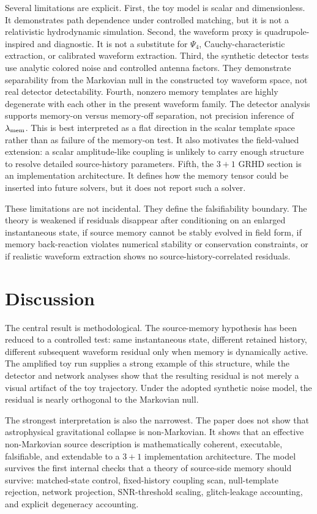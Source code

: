 \documentclass[11pt]{article}
\begin{document}
Several limitations are explicit. First, the toy model is scalar and dimensionless. It demonstrates path dependence under controlled matching, but it is not a relativistic hydrodynamic simulation. Second, the waveform proxy is quadrupole-inspired and diagnostic. It is not a substitute for \(\Psi_4\), Cauchy-characteristic extraction, or calibrated waveform extraction. Third, the synthetic detector tests use analytic colored noise and controlled antenna factors. They demonstrate separability from the Markovian null in the constructed toy waveform space, not real detector detectability. Fourth, nonzero memory templates are highly degenerate with each other in the present waveform family. The detector analysis supports memory-on versus memory-off separation, not precision inference of \(\lambda_{\rm mem}\). This is best interpreted as a flat direction in the scalar template space rather than as failure of the memory-on test. It also motivates the field-valued extension: a scalar amplitude-like coupling is unlikely to carry enough structure to resolve detailed source-history parameters. Fifth, the \(3+1\) GRHD section is an implementation architecture. It defines how the memory tensor could be inserted into future solvers, but it does not report such a solver.

These limitations are not incidental. They define the falsifiability boundary. The theory is weakened if residuals disappear after conditioning on an enlarged instantaneous state, if source memory cannot be stably evolved in field form, if memory back-reaction violates numerical stability or conservation constraints, or if realistic waveform extraction shows no source-history-correlated residuals.

\section{Discussion}
\label{sec:discussion}

The central result is methodological. The source-memory hypothesis has been reduced to a controlled test: same instantaneous state, different retained history, different subsequent waveform residual only when memory is dynamically active. The amplified toy run supplies a strong example of this structure, while the detector and network analyses show that the resulting residual is not merely a visual artifact of the toy trajectory. Under the adopted synthetic noise model, the residual is nearly orthogonal to the Markovian null.

The strongest interpretation is also the narrowest. The paper does not show that astrophysical gravitational collapse is non-Markovian. It shows that an effective non-Markovian source description is mathematically coherent, executable, falsifiable, and extendable to a \(3+1\) implementation architecture. The model survives the first internal checks that a theory of source-side memory should survive: matched-state control, fixed-history coupling scan, null-template rejection, network projection, SNR-threshold scaling, glitch-leakage accounting, and explicit degeneracy accounting.
\end{document}
